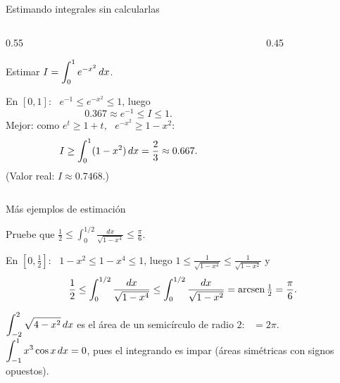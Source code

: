 \documentclass[10pt,aspectratio=169]{beamer}
\begin{document}
\begin{frame}{Estimando integrales sin calcularlas}
  \begin{columns}
    \begin{column}{0.55\textwidth}
      \begin{ejemplo}[1]
        Estimar $\displaystyle I=\int_0^1e^{-x^2}\,dx$.

        En $[0,1]$: \ $e^{-1}\le e^{-x^2}\le 1$, luego
        \[ 0.367\approx e^{-1}\le I\le 1. \]
        Mejor: como $e^{t}\ge1+t$, \ $e^{-x^2}\ge1-x^2$:
        \[ I\ge\int_0^1(1-x^2)\,dx=\frac23\approx0.667. \]
        (Valor real: $I\approx0.7468$.)
      \end{ejemplo}
    \end{column}
    \begin{column}{0.45\textwidth}
      \centering
    \end{column}
  \end{columns}
\end{frame}

\begin{frame}{Más ejemplos de estimación}
  \begin{ejemplo}[2]
    Pruebe que $\displaystyle\frac12\le\int_0^{1/2}\frac{dx}{\sqrt{1-x^4}}\le\frac{\pi}{6}$.

    En $[0,\tfrac12]$: \ $1-x^2\le 1-x^4\le 1$, luego
    $\displaystyle 1\le\frac{1}{\sqrt{1-x^4}}\le\frac{1}{\sqrt{1-x^2}}$ y
    \[ \frac12\le\int_0^{1/2}\frac{dx}{\sqrt{1-x^4}}\le\int_0^{1/2}\frac{dx}{\sqrt{1-x^2}}=\operatorname{arcsen}\tfrac12=\frac{\pi}{6}. \]
  \end{ejemplo}
  \begin{ejemplo}
    $\displaystyle\int_{-2}^{2}\sqrt{4-x^2}\,dx$ es el área de un semicírculo de radio $2$: \ $=2\pi$.\\
    $\displaystyle\int_{-1}^{1}x^3\cos x\,dx=0$, pues el integrando es impar (áreas simétricas con signos opuestos).
  \end{ejemplo}
\end{frame}
\end{document}
